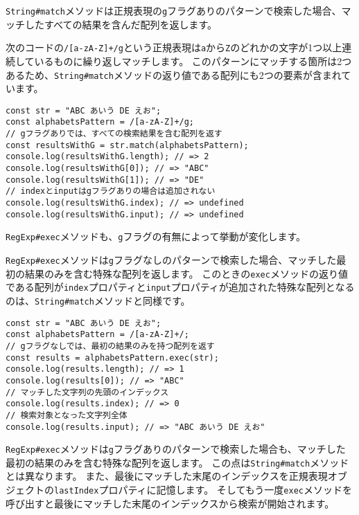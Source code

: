\texttt{String\#match}メソッドは正規表現の\texttt{g}フラグありのパターンで検索した場合、マッチしたすべての結果を含んだ配列を返します。

次のコードの\texttt{/[a-zA-Z]+/g}という正規表現は\texttt{a}から\texttt{Z}のどれかの文字が1つ以上連続しているものに繰り返しマッチします。
このパターンにマッチする箇所は2つあるため、\texttt{String\#match}メソッドの返り値である配列にも2つの要素が含まれています。

\begin{lstlisting}
const str = "ABC あいう DE えお";
const alphabetsPattern = /[a-zA-Z]+/g;
// gフラグありでは、すべての検索結果を含む配列を返す
const resultsWithG = str.match(alphabetsPattern);
console.log(resultsWithG.length); // => 2
console.log(resultsWithG[0]); // => "ABC"
console.log(resultsWithG[1]); // => "DE"
// indexとinputはgフラグありの場合は追加されない
console.log(resultsWithG.index); // => undefined
console.log(resultsWithG.input); // => undefined
\end{lstlisting}

\texttt{RegExp\#exec}メソッドも、\texttt{g}フラグの有無によって挙動が変化します。

\texttt{RegExp\#exec}メソッドは\texttt{g}フラグなしのパターンで検索した場合、マッチした最初の結果のみを含む特殊な配列を返します。
このときの\texttt{exec}メソッドの返り値である配列が\texttt{index}プロパティと\texttt{input}プロパティが追加された特殊な配列となるのは、\texttt{String\#match}メソッドと同様です。

\begin{lstlisting}
const str = "ABC あいう DE えお";
const alphabetsPattern = /[a-zA-Z]+/;
// gフラグなしでは、最初の結果のみを持つ配列を返す
const results = alphabetsPattern.exec(str);
console.log(results.length); // => 1
console.log(results[0]); // => "ABC"
// マッチした文字列の先頭のインデックス
console.log(results.index); // => 0
// 検索対象となった文字列全体
console.log(results.input); // => "ABC あいう DE えお"
\end{lstlisting}

\texttt{RegExp\#exec}メソッドは\texttt{g}フラグありのパターンで検索した場合も、マッチした最初の結果のみを含む特殊な配列を返します。
この点は\texttt{String\#match}メソッドとは異なります。
また、最後にマッチした末尾のインデックスを正規表現オブジェクトの\texttt{lastIndex}プロパティに記憶します。
そしてもう一度\texttt{exec}メソッドを呼び出すと最後にマッチした末尾のインデックスから検索が開始されます。

